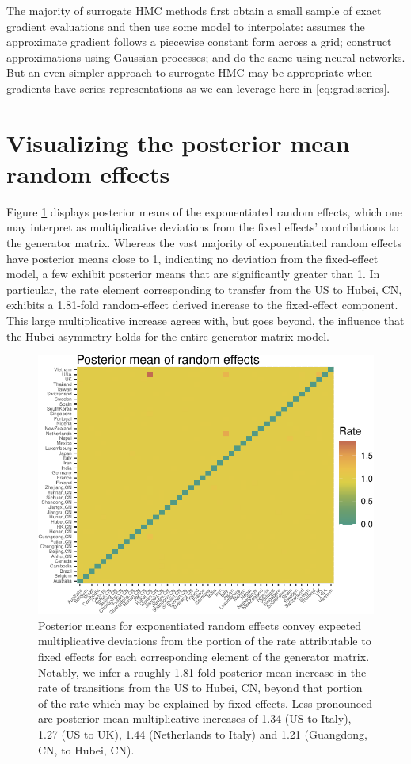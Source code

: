 \documentclass[9pt,twocolumn,twoside]{pnas-new}
\newcommand{\?}{\textbf{?}}
\begin{document}
The majority of surrogate HMC methods first obtain a small sample of
exact gradient evaluations and then use some model to interpolate:
\cite{zhang2017precomputing} assumes the approximate gradient follows
a piecewise constant form across a grid;
\cite{rasmussen2003gaussian,lan2016emulation} construct approximations
using Gaussian processes; and \cite{zhang2017hamiltonian,li2019neural}
do the same using neural networks.  But an even simpler approach to
surrogate HMC may be appropriate when gradients have series
representations as we can leverage here in \eqref{eq:grad:series}.

\section{Visualizing the posterior mean random effects}\label{sec:randomEffs}


Figure \ref{fig:randEffs} displays posterior means of the exponentiated random effects, which one may interpret as multiplicative deviations from the fixed effects' contributions to the generator matrix.  Whereas the vast majority of exponentiated random effects have posterior means close to 1, indicating no deviation from the fixed-effect model, a few exhibit posterior means that are significantly greater than 1.  In particular, the rate element corresponding to transfer from the US to Hubei, CN, exhibits a 1.81-fold random-effect derived increase to the fixed-effect component.  This large multiplicative increase agrees with, but goes beyond, the influence that the Hubei asymmetry holds for the entire generator matrix model. 

\begin{figure}[t]
	\centering
	\includegraphics[width=0.8\linewidth]{figures/randEffects.pdf}
	\caption{Posterior means for exponentiated random effects convey expected multiplicative deviations from the portion of the rate attributable to fixed effects for each corresponding element of the generator matrix.  Notably, we infer a roughly 1.81-fold posterior mean increase in the rate of transitions from the US to Hubei, CN, beyond that portion of the rate which may be explained by fixed effects.  Less pronounced are posterior mean multiplicative increases of 1.34 (US to Italy), 1.27 (US to UK), 1.44 (Netherlands to Italy) and 1.21 (Guangdong, CN, to Hubei, CN).}\label{fig:randEffs}
\end{figure}

\end{document}
